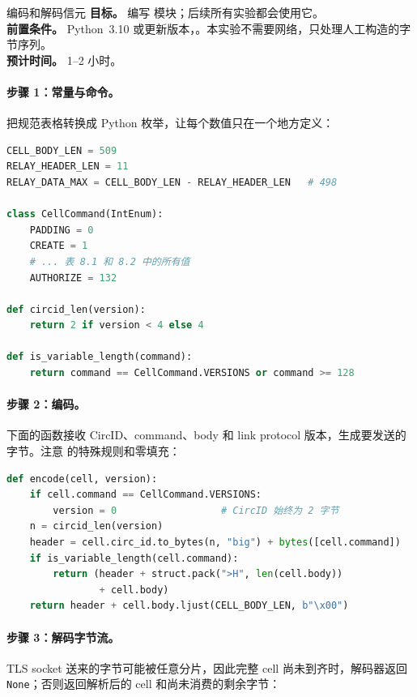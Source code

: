 \begin{laboratorio}[2]{编码和解码信元}
\textbf{目标。} 编写  模块；后续所有实验都会使用它。\\
\textbf{前置条件。} Python~3.10 或更新版本，。本实验不需要网络，只处理人工构造的字节序列。\\
\textbf{预计时间。} 1--2 小时。
\end{laboratorio}

\paragraph{步骤 1：常量与命令。} 把规范表格转换成 Python 枚举，让每个数值只在一个地方定义：

\begin{lstlisting}[language=Python]
CELL_BODY_LEN = 509
RELAY_HEADER_LEN = 11
RELAY_DATA_MAX = CELL_BODY_LEN - RELAY_HEADER_LEN   # 498

class CellCommand(IntEnum):
    PADDING = 0
    CREATE = 1
    # ... 表 8.1 和 8.2 中的所有值
    AUTHORIZE = 132

def circid_len(version):
    return 2 if version < 4 else 4

def is_variable_length(command):
    return command == CellCommand.VERSIONS or command >= 128
\end{lstlisting}

\paragraph{步骤 2：编码。} 下面的函数接收 CircID、command、body 和 link protocol 版本，生成要发送的字节。注意  的特殊规则和零填充：

\begin{lstlisting}[language=Python]
def encode(cell, version):
    if cell.command == CellCommand.VERSIONS:
        version = 0                  # CircID 始终为 2 字节
    n = circid_len(version)
    header = cell.circ_id.to_bytes(n, "big") + bytes([cell.command])
    if is_variable_length(cell.command):
        return (header + struct.pack(">H", len(cell.body))
                + cell.body)
    return header + cell.body.ljust(CELL_BODY_LEN, b"\x00")
\end{lstlisting}

\paragraph{步骤 3：解码字节流。} TLS socket 送来的字节可能被任意分片，因此完整 cell 尚未到齐时，解码器返回 \texttt{None}；否则返回解析后的 cell 和尚未消费的剩余字节：


